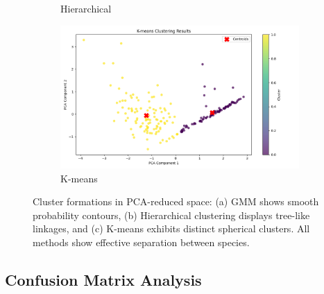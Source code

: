 \documentclass[a4paper,12pt]{report}
\begin{document}
\begin{figure}[H]
\begin{subfigure}[b]{0.32\textwidth}
        \caption{Hierarchical}
        \label{fig:hierarchical_cluster}
    \end{subfigure}
    \hfill
    \begin{subfigure}[b]{0.32\textwidth}
        \centering
        \includegraphics[width=\textwidth]{images/clustering/kmeans_clustering.png}
        \caption{K-means}
        \label{fig:kmeans_cluster}
    \end{subfigure}
    \caption{Cluster formations in PCA-reduced space: (a) GMM shows smooth probability contours, (b) Hierarchical clustering displays tree-like linkages, and (c) K-means exhibits distinct spherical clusters. All methods show effective separation between species.}
    \label{fig:cluster_visualizations}
\end{figure}

\subsection{Confusion Matrix Analysis}
\end{document}
